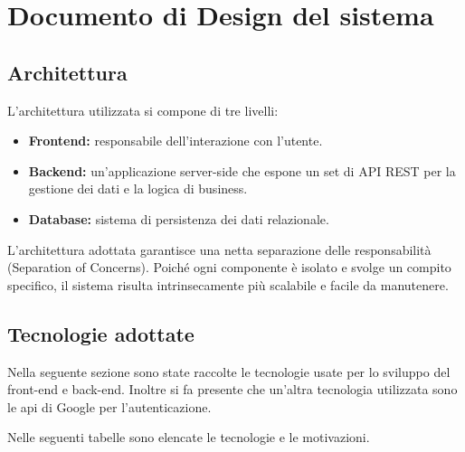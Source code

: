\documentclass{article}
\begin{document}
\newpage
\section{Documento di Design del sistema}
\subsection{Architettura}

L'architettura utilizzata si compone di tre livelli:

\begin{itemize}
    \item \textbf{Frontend:} responsabile dell’interazione con l’utente.
    \item \textbf{Backend:} un’applicazione server-side che espone un set di API REST per la gestione dei dati e la logica di business.
    \item \textbf{Database:} sistema di persistenza dei dati relazionale.
\end{itemize}

L'architettura adottata garantisce una netta separazione delle responsabilità (Separation of Concerns). Poiché ogni componente è isolato e svolge un compito specifico, il sistema risulta intrinsecamente più scalabile e facile da manutenere.
\clearpage
\subsection{Tecnologie adottate}
Nella seguente sezione sono state raccolte le tecnologie usate per lo sviluppo del front-end e back-end. 
Inoltre si fa presente che un'altra tecnologia utilizzata sono le api di Google per l'autenticazione. 

Nelle seguenti tabelle sono elencate le tecnologie e le motivazioni. 
\end{document}
